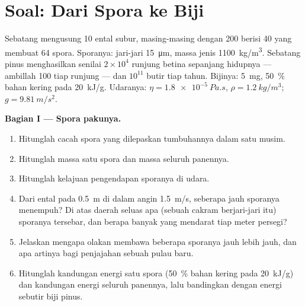 \section{Soal: Dari Spora ke Biji}

\begin{problem}
\label{pb:b2:plant-life-cycles:1}
Sebatang  mengusung \num{10} ental subur, masing-masing
dengan \num{200}  berisi \num{40}  yang membuat
\num{64} spora. Sporanya: jari-jari \qty{15}{\micro m}, massa jenis
\qty{1100}{kg/m^3}. Sebatang pinus menghasilkan  senilai
$2\times 10^{4}$ runjung betina sepanjang hidupnya --- ambillah
\num{100}  tiap runjung --- dan $10^{11}$ butir 
tiap tahun. Bijinya: \qty{5}{mg}, \qty{50}{\%} bahan kering pada
\qty{20}{kJ/g}. Udaranya: $\eta = \qty{1.8e-5}{Pa.s}$, $\rho =
\qty{1.2}{kg/m^3}$; $g = \qty{9.81}{m/s^2}$.

\medskip
\noindent\textbf{Bagian I --- Spora pakunya.}
\begin{enumerate}
  \item Hitunglah cacah spora yang dilepaskan tumbuhannya dalam satu
        musim.
  \item Hitunglah massa satu spora dan massa seluruh panennya.
  \item Hitunglah kelajuan pengendapan sporanya di udara.
  \item Dari ental pada \qty{0.5}{m} di dalam angin \qty{1.5}{m/s},
        seberapa jauh sporanya menempuh? Di atas daerah seluas apa
        (sebuah cakram berjari-jari itu) sporanya tersebar, dan berapa
        banyak yang mendarat tiap meter persegi?
  \item Jelaskan mengapa olakan membawa beberapa sporanya jauh lebih
        jauh, dan apa artinya bagi penjajahan sebuah pulau baru.
  \item Hitunglah kandungan energi satu spora (\qty{50}{\%} bahan
        kering pada \qty{20}{kJ/g}) dan kandungan energi seluruh
        panennya, lalu bandingkan dengan energi sebutir biji pinus.
\end{enumerate}


\end{problem}
